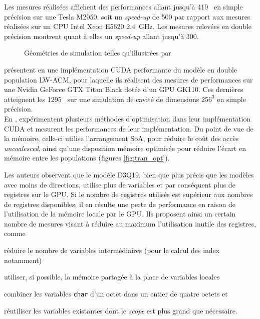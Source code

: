 Les mesures réalisées affichent des performances allant jusqu'à 419~ en simple précision sur une  Tesla M2050, soit un \textit{speed-up} de 500 par rapport aux mesures réalisées sur un \acs{CPU} Intel Xeon E5620 2.4~GHz. Les mesures relevées en double précision montrent quant à elles un \textit{speed-up} allant jusqu'à 300.\\
\begin{figure}[H]
	\centering
	\caption{Géométries de simulation telles qu'illustrées par \cite{campos_lattice_2016}}
	\label{fig:campos_domaine}
\end{figure} 

\citet{obrecht_thermal_2016} présentent en \citeyear{obrecht_thermal_2016} une implémentation CUDA performante du modèle en double population LW-ACM, pour laquelle ils réalisent des mesures de performances sur une Nvidia GeForce GTX Titan Black dotée d'un \acs{GPU} GK110. Ces dernières atteignent les 1295~ sur une simulation de cavité de dimensions $256^3$ en simple précision. \\

En \citeyear{tran_performance_2017}, \citet{tran_performance_2017} expérimentent plusieurs méthodes d'optimisation dans leur implémentation CUDA et mesurent les performances de leur implémentation. Du point de vue de la mémoire, celle-ci utilise l'arrangement SoA, pour réduire le coût des accès \textit{uncoalesced}, ainsi qu'une disposition mémoire optimisée pour réduire l'écart en mémoire entre les populations (figures \ref{fig:tran_opt}).

Les auteurs observent que le modèle D3Q19, bien que plus précis que les modèles avec moins de directions, utilise plus de variables et par conséquent plus de registres sur le \acs{GPU}. Si le nombre de registres utilisés est supérieur aux nombres de registres disponibles, il en résulte une perte de performance en raison de l'utilisation de la mémoire locale par le \acs{GPU}. Ils proposent ainsi un certain nombre de mesures visant à réduire au maximum l'utilisation inutile des registres, comme 
\begin{enumerate*}[label=\alph*.]
	\item réduire le nombre de variables intermédiaires (pour le calcul des index notamment)
	\item utiliser, si possible, la mémoire partagée à la place de variables locales 
	\item combiner les variables \texttt{char} d'un octet dans un entier de quatre octets et
	\item réutiliser les variables existantes dont le \textit{scope} est plus grand que nécessaire.
\end{enumerate*}

